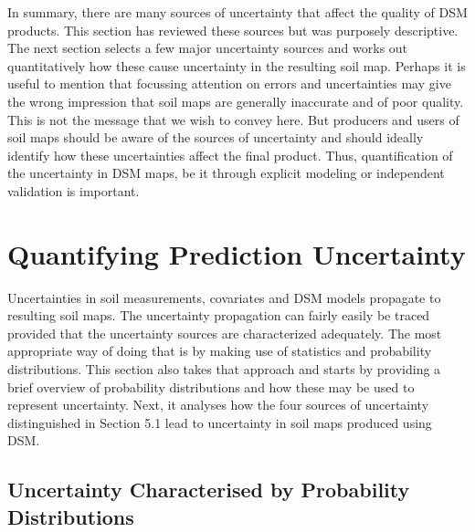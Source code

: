 \documentclass[10pt,b5paper,]{book}
\theoremstyle{definition}
\theoremstyle{definition}
\theoremstyle{definition}
\theoremstyle{remark}
\begin{document}
In summary, there are many sources of uncertainty that affect the
quality of DSM products. This section has reviewed these sources but was
purposely descriptive. The next section selects a few major uncertainty
sources and works out quantitatively how these cause uncertainty in the
resulting soil map. Perhaps it is useful to mention that focussing
attention on errors and uncertainties may give the wrong impression that
soil maps are generally inaccurate and of poor quality. This is not the
message that we wish to convey here. But producers and users of soil
maps should be aware of the sources of uncertainty and should ideally
identify how these uncertainties affect the final product. Thus,
quantification of the uncertainty in DSM maps, be it through explicit
modeling or independent validation is important.

\hypertarget{quantifying-prediction-uncertainty}{%
\section{Quantifying Prediction
Uncertainty}\label{quantifying-prediction-uncertainty}}

Uncertainties in soil measurements, covariates and DSM models propagate
to resulting soil maps. The uncertainty propagation can fairly easily be
traced provided that the uncertainty sources are characterized
adequately. The most appropriate way of doing that is by making use of
statistics and probability distributions. This section also takes that
approach and starts by providing a brief overview of probability
distributions and how these may be used to represent uncertainty. Next,
it analyses how the four sources of uncertainty distinguished in Section
5.1 lead to uncertainty in soil maps produced using DSM.

\hypertarget{uncertainty-characterised-by-probability-distributions}{%
\subsection{Uncertainty Characterised by Probability
Distributions}\label{uncertainty-characterised-by-probability-distributions}}
\end{document}

